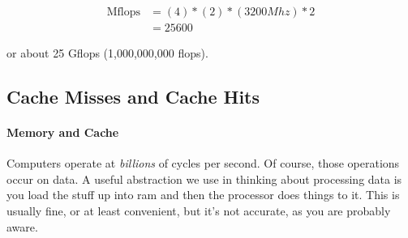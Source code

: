 \begin{align*}
\text{Mflops} &= (4) * (2) * (3200 Mhz) * 2 \\ 
&= 25600 
\end{align*}

or about 25 Gflops (1,000,000,000 flops).




\subsection{Cache Misses and Cache Hits}

\paragraph{Memory and Cache}

Computers operate at \emph{billions} of cycles per second.  Of course, those operations occur on data.  A useful abstraction we use in thinking about processing data is you load the stuff up into ram and then the processor does things to it.  This is usually fine, or at least convenient, but it's not accurate, as you are probably aware.  


